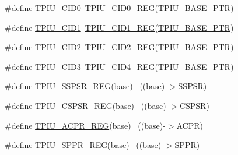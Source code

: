 \begin{DoxyCompactItemize}
\#define \hyperlink{group___t_p_i_u___register___accessor___macros_gadebf3e786cb3a0be9090de57cc9971ad}{T\+P\+I\+U\+\_\+\+C\+I\+D0}~\hyperlink{group___t_p_i_u___register___accessor___macros_gae0f119eaf4617470a270da91ce27f9fb}{T\+P\+I\+U\+\_\+\+C\+I\+D0\+\_\+\+R\+EG}(\hyperlink{group___t_p_i_u___peripheral_ga9294dc3ec1881014ac83408db60de6a0}{T\+P\+I\+U\+\_\+\+B\+A\+S\+E\+\_\+\+P\+TR})
\item 
\#define \hyperlink{group___t_p_i_u___register___accessor___macros_gabf57af574589b5f4b5414e0116afd57d}{T\+P\+I\+U\+\_\+\+C\+I\+D1}~\hyperlink{group___t_p_i_u___register___accessor___macros_ga3b9d84f25d7269b36d2c74fa5420450c}{T\+P\+I\+U\+\_\+\+C\+I\+D1\+\_\+\+R\+EG}(\hyperlink{group___t_p_i_u___peripheral_ga9294dc3ec1881014ac83408db60de6a0}{T\+P\+I\+U\+\_\+\+B\+A\+S\+E\+\_\+\+P\+TR})
\item 
\#define \hyperlink{group___t_p_i_u___register___accessor___macros_ga6dcaf432d12b9c73b2db40c0b06eaa77}{T\+P\+I\+U\+\_\+\+C\+I\+D2}~\hyperlink{group___t_p_i_u___register___accessor___macros_ga5a60a1d412839185c0398f0b29153430}{T\+P\+I\+U\+\_\+\+C\+I\+D2\+\_\+\+R\+EG}(\hyperlink{group___t_p_i_u___peripheral_ga9294dc3ec1881014ac83408db60de6a0}{T\+P\+I\+U\+\_\+\+B\+A\+S\+E\+\_\+\+P\+TR})
\item 
\#define \hyperlink{group___t_p_i_u___register___accessor___macros_ga73504328272607fbb53054442b6d4bb8}{T\+P\+I\+U\+\_\+\+C\+I\+D3}~\hyperlink{group___t_p_i_u___register___accessor___macros_ga887058c50d4ad4cfce8fefc4275e9dc2}{T\+P\+I\+U\+\_\+\+C\+I\+D4\+\_\+\+R\+EG}(\hyperlink{group___t_p_i_u___peripheral_ga9294dc3ec1881014ac83408db60de6a0}{T\+P\+I\+U\+\_\+\+B\+A\+S\+E\+\_\+\+P\+TR})
\item 
\#define \hyperlink{group___t_p_i_u___register___accessor___macros_ga70f7b58922eb91eec6196998a950e7e6}{T\+P\+I\+U\+\_\+\+S\+S\+P\+S\+R\+\_\+\+R\+EG}(base)                                      ~((base)-\/$>$S\+S\+P\+SR)
\item 
\#define \hyperlink{group___t_p_i_u___register___accessor___macros_gafea47d54b3ce624f0b487095a33f87ee}{T\+P\+I\+U\+\_\+\+C\+S\+P\+S\+R\+\_\+\+R\+EG}(base)                                      ~((base)-\/$>$C\+S\+P\+SR)
\item 
\#define \hyperlink{group___t_p_i_u___register___accessor___macros_gaa1533cc1963e2e41268410ac18591036}{T\+P\+I\+U\+\_\+\+A\+C\+P\+R\+\_\+\+R\+EG}(base)                                        ~((base)-\/$>$A\+C\+PR)
\item 
\#define \hyperlink{group___t_p_i_u___register___accessor___macros_ga0999ff94c91a95cc02e2bbd25f41f2b4}{T\+P\+I\+U\+\_\+\+S\+P\+P\+R\+\_\+\+R\+EG}(base)                                        ~((base)-\/$>$S\+P\+PR)

\end{DoxyCompactItemize}
